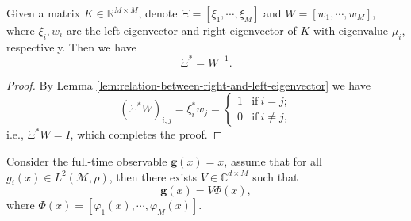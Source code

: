 \documentclass[en, bibend=bibtex]{elegantpaper}
\theoremstyle{plain}
\begin{document}
\begin{proposition}
  Given a matrix $K \in \mathbb{R}^{M \times M}$,
  denote $\Xi = [\xi_1,\cdots,\xi_M]$ and $W = [w_1,\cdots,w_M]$,
  where $\xi_i, w_i$ are the left eigenvector and right eigenvector
  of $K$ with eigenvalue $\mu_i$, respectively.
  Then we have
  \begin{equation}
    \label{eq:relation-between-right-and-left-eigenvector-matrix}
    \Xi^{\ast} = W^{-1}.
  \end{equation}
\end{proposition}

\begin{proof}
  By Lemma \ref{lem:relation-between-right-and-left-eigenvector}
  we have
  \begin{equation*}
  (\Xi^{\ast}W)_{i,j} = \xi_i^{\ast} w_j =
  \begin{cases}
    1 & \text{if} ~ i = j;\\
    0 & \text{if} ~ i \neq j,
  \end{cases}
  \end{equation*}
  i.e., $\Xi^{\ast}W = I$, which completes the proof.
\end{proof}

\begin{proposition}
  Consider the full-time observable $\mathbf{g}(x) = x$,
  assume that for all $g_i(x) \in L^2(\mathcal{M}, \rho)$,
  then there exists $V \in \mathbb{C}^{d \times M}$ such that
  \begin{equation*}
    \mathbf{g}(x) = V \Phi(x),
  \end{equation*}
  where $\Phi(x) = [\varphi_1(x),\cdots,\varphi_M(x)]$.
\end{proposition}
\end{document}
